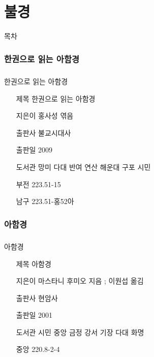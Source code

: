 \documentclass[aspectratio=1610,14pt,xcolor=pdftex,dvipsnames,table,handout]{beamer}
\begin{document}
		\part{ 불경 }
		\frame{\partpage}

		\begin{frame} [plain]{목차}
		\tableofcontents%
		\end{frame}


		\section{ 한권으로 읽는 아함경 }
		\begin{frame} [t,plain]
		\frametitle{}
			\begin{block} { 한권으로 읽는 아함경 }
			\setlength{\leftmargini}{4em}			
			\begin{itemize}
				\item [제목]  	한권으로 읽는 아함경 
				\item [지은이]	홍사성 엮음
				\item [출판사]	불교시대사
				\item [출판일]	2009

				\item [도서관] 	망미 다대 반여 연산 해운대 구포 시민 
				\item [부전]		223.51-15
				\item [남구]		223.51-홍52아
			\end{itemize}
			\end{block}						
		\end{frame}						


		\section{ 아함경 }
		\begin{frame} [t,plain]
		\frametitle{}
			\begin{block} { 아함경 }
			\setlength{\leftmargini}{4em}			
			\begin{itemize}
				\item [제목]  	아함경 
				\item [지은이]	마스타니 후미오 지음 ; 이원섭 옮김
				\item [출판사]	현암사
				\item [출판일]	2001

				\item [도서관] 	시민 중앙 금정 강서 기장 다대 화명
				\item [중앙]		220.8-2-4
			\end{itemize}
			\end{block}						
		\end{frame}						
\end{document}
